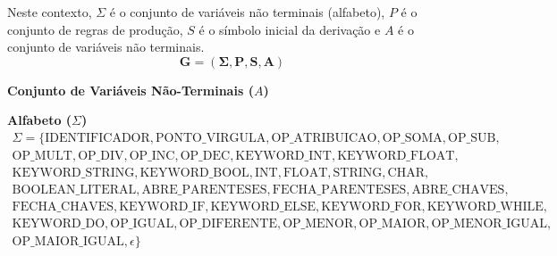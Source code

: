 \documentclass[12pt,a4paper]{article}
\begin{document}
Neste contexto, $\Sigma$ é o conjunto de variáveis não terminais (alfabeto), $P$ é o conjunto de regras de produção, $S$ é o símbolo inicial da derivação e $A$ é o conjunto de variáveis não terminais.
\begin{equation}
    \label{eq:gram}
    \boldsymbol{G = (\Sigma, P, S, A)}
\end{equation}

\textbf{Conjunto de Variáveis Não-Terminais ($A$)}

\textbf{Alfabeto ($\Sigma$)}
\begin{multline*}
\Sigma = \{ \text{IDENTIFICADOR}, \text{PONTO\_VIRGULA}, \text{OP\_ATRIBUICAO}, \text{OP\_SOMA}, \text{OP\_SUB}, \\
\text{OP\_MULT}, \text{OP\_DIV}, \text{OP\_INC}, \text{OP\_DEC}, \text{KEYWORD\_INT}, \text{KEYWORD\_FLOAT}, \\
\text{KEYWORD\_STRING}, \text{KEYWORD\_BOOL}, \text{INT}, \text{FLOAT}, \text{STRING}, \text{CHAR}, \\
\text{BOOLEAN\_LITERAL}, \text{ABRE\_PARENTESES}, \text{FECHA\_PARENTESES}, \text{ABRE\_CHAVES}, \\
\text{FECHA\_CHAVES}, \text{KEYWORD\_IF}, \text{KEYWORD\_ELSE}, \text{KEYWORD\_FOR}, \text{KEYWORD\_WHILE}, \\
\text{KEYWORD\_DO}, \text{OP\_IGUAL}, \text{OP\_DIFERENTE}, \text{OP\_MENOR}, \text{OP\_MAIOR}, \text{OP\_MENOR\_IGUAL}, \\
\text{OP\_MAIOR\_IGUAL}, \epsilon \}
\end{multline*}
\end{document}
